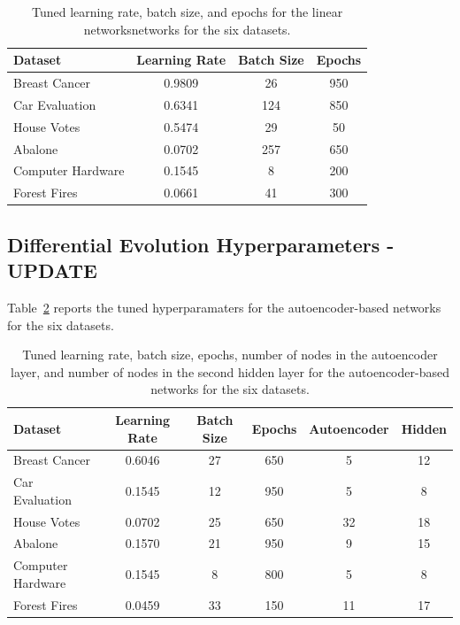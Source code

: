 \documentclass[twoside,11pt]{article}
\begin{document}
\begin{table}[h]
    \centering
    \begin{tabular}{lccc}
    \hline
    Dataset & Learning Rate & Batch Size & Epochs \\
    \hline
    Breast Cancer      & 0.9809    & 26   & 950 \\
    Car Evaluation     & 0.6341   & 124 & 850 \\
    House Votes        & 0.5474    & 29    & 50 \\
    Abalone            & 0.0702  & 257 & 650 \\
    Computer Hardware  & 0.1545   & 8  & 200 \\
    Forest Fires       & 0.0661   & 41  & 300 \\
    \hline
    \end{tabular}
    \caption{Tuned learning rate, batch size, and epochs for the linear networksnetworks for the six datasets.}
    \label{tab:linear-tuning}
\end{table}

\subsection{Differential Evolution Hyperparameters - UPDATE}
Table~\ref{tab:autoencoder-tuning} reports the tuned hyperparamaters for the autoencoder-based networks for the six datasets.

\begin{table}[h]
    \centering
    \begin{tabular}{lccccc}
    \hline
    Dataset & Learning Rate & Batch Size & Epochs & Autoencoder & Hidden \\
    \hline
    Breast Cancer      & 0.6046    & 27   & 650  & 5    & 12 \\
    Car Evaluation     & 0.1545   & 12 & 950    & 5   & 8 \\
    House Votes        & 0.0702    & 25    & 650     & 32    & 18 \\
    Abalone            & 0.1570  & 21 & 950     & 9    & 15 \\
    Computer Hardware  & 0.1545   & 8  & 800   & 5     & 8 \\
    Forest Fires       & 0.0459   & 33  & 150    & 11    & 17 \\
    \hline
    \end{tabular}
    \caption{Tuned learning rate, batch size, epochs, number of nodes in the autoencoder layer, and number of nodes in the second hidden layer for the autoencoder-based networks for the six datasets.}
    \label{tab:autoencoder-tuning}
\end{table}
\end{document}
